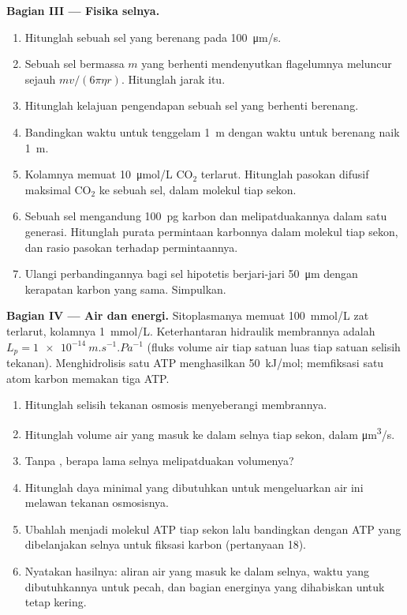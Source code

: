 \begin{problem}
\medskip
\noindent\textbf{Bagian III --- Fisika selnya.}
\begin{enumerate}[resume]
  \item Hitunglah  sebuah sel yang berenang pada
        \qty{100}{\micro m/s}.
  \item Sebuah sel bermassa $m$ yang berhenti mendenyutkan flagelumnya
        meluncur sejauh $mv/(6\pi\eta r)$. Hitunglah jarak itu.
  \item Hitunglah kelajuan pengendapan sebuah sel yang berhenti
        berenang.
  \item Bandingkan waktu untuk tenggelam \qty{1}{m} dengan waktu untuk
        berenang naik \qty{1}{m}.
  \item Kolamnya memuat \qty{10}{\micro mol/L} $\mathrm{CO_2}$
        terlarut. Hitunglah pasokan difusif maksimal
        $\mathrm{CO_2}$ ke sebuah sel, dalam molekul tiap sekon.
  \item Sebuah sel mengandung \qty{100}{pg} karbon dan melipatduakannya
        dalam satu generasi. Hitunglah purata permintaan karbonnya dalam
        molekul tiap sekon, dan rasio pasokan terhadap permintaannya.
  \item Ulangi perbandingannya bagi sel hipotetis berjari-jari
        \qty{50}{\micro m} dengan kerapatan karbon yang sama. Simpulkan.
\end{enumerate}

\medskip
\noindent\textbf{Bagian IV --- Air dan energi.}
Sitoplasmanya memuat \qty{100}{mmol/L} zat terlarut, kolamnya
\qty{1}{mmol/L}. Keterhantaran hidraulik membrannya adalah $L_p =
\qty{1e-14}{m.s^{-1}.Pa^{-1}}$ (fluks volume air tiap satuan luas tiap
satuan selisih tekanan). Menghidrolisis satu ATP menghasilkan
\qty{50}{kJ/mol}; memfiksasi satu atom karbon memakan tiga ATP.
\begin{enumerate}[resume]
  \item Hitunglah selisih tekanan osmosis menyeberangi membrannya.
  \item Hitunglah volume air yang masuk ke dalam selnya tiap sekon,
        dalam \unit{\micro m^3/s}.
  \item Tanpa , berapa lama selnya melipatduakan
        volumenya?
  \item Hitunglah daya minimal yang dibutuhkan untuk mengeluarkan air
        ini melawan tekanan osmosisnya.
  \item Ubahlah menjadi molekul ATP tiap sekon lalu bandingkan dengan
        ATP yang dibelanjakan selnya untuk fiksasi karbon (pertanyaan 18).
  \item Nyatakan hasilnya: aliran air yang masuk ke dalam selnya, waktu
        yang dibutuhkannya untuk pecah, dan bagian energinya yang
        dihabiskan untuk tetap kering.
\end{enumerate}
\end{problem}
